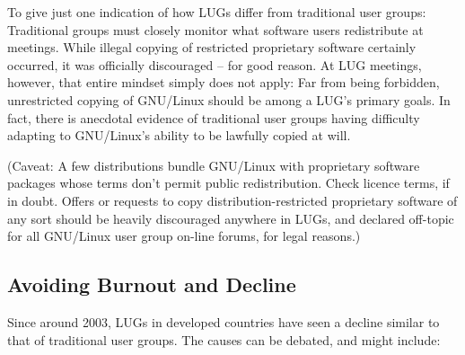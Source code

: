 \documentclass{HOWTO}
\begin{document}
To give just one indication of how LUGs differ from traditional 
user groups: Traditional groups must closely 
monitor what software users redistribute at meetings.
While illegal copying of restricted proprietary software certainly
occurred, it was officially discouraged -- for good reason.
At LUG meetings, however, that entire mindset simply does not apply:
Far from being forbidden, unrestricted copying of GNU/Linux
should be among a LUG's primary goals.  In fact, there is anecdotal
evidence of traditional user groups having difficulty adapting to
GNU/Linux's ability to be lawfully copied at will.

(Caveat:  A few distributions bundle GNU/Linux with proprietary
software packages whose terms don't permit public redistribution.
Check licence terms, if in doubt.  Offers or requests to copy 
distribution-restricted proprietary software of any sort should be
heavily discouraged anywhere in LUGs, and declared off-topic for all 
GNU/Linux user group on-line forums, for legal reasons.)




\subsection{Avoiding Burnout and Decline}

Since around 2003, LUGs in developed countries have seen a decline
similar to that of traditional user groups.  The causes can be debated,
and might include:
\end{document}
